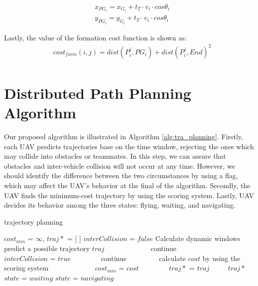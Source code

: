 \begin{equation}
\begin{aligned}
& x_{PG_{i}} = x_{G_{i}} + t_{T}\cdot v_{i}\cdot cos\theta_{i} \\
& y_{PG_{i}} = y_{G_{i}} + t_{T}\cdot v_{i}\cdot cos\theta_{i} 
\end{aligned}
\end{equation}

Lastly, the value of the formation cost function is shown as:
\begin{equation}
\begin{aligned}
& cost_{form}(i, j) = dist(P^{j}_{i}, PG_{i}) + dist(P^{j}_{i}, End)^2 \\
\end{aligned}
\end{equation}


\section{Distributed Path Planning Algorithm}
Our proposed algorithm is illustrated in Algorithm \ref{alg:tra_planning}. Firstly, each UAV predicts trajectories base on the time window, rejecting the ones which may collide into obstacles or teammates. In this step, we can assure that obstacles and inter-vehicle collision will not occur at any time. However, we should identify the difference between the two circumstances by using a flag, which may affect the UAV's behavior at the final of the algorithm. Secondly, the UAV finds the minimum-cost trajectory by using the scoring system. Lastly, UAV decides its behavior among the three states: flying, waiting, and navigating.

\begin{algorithm}[htbp] 
\caption{\label{alg:tra_planning}trajectory planning}
\begin{algorithmic}[1]
\State $cost_{min}$ = $\infty$, $traj*$ = [ ]
\State $interCollision$ = $false$
\State Calculate dynamic windows
        \State predict a possible trajectory $traj$
    　　　　\State continue
    　　\EndIf
    　　　　\State $interCollision$ = $true$
    　　　　\State continue
    　　\EndIf
    　　\State calculate $cost$ by using the scoring system 
    　　　　\State $cost_{min}$ = $cost$
    　　　　\State $traj*$ = $traj$
    　　\EndIf
    \EndFor
\EndFor
{}
    \State \Return $traj*$
        \State \Return $state$ = $waiting$
    \EndIf
\EndIf
\State \Return $state$ = $navigating$

\end{algorithmic}
\end{algorithm}

